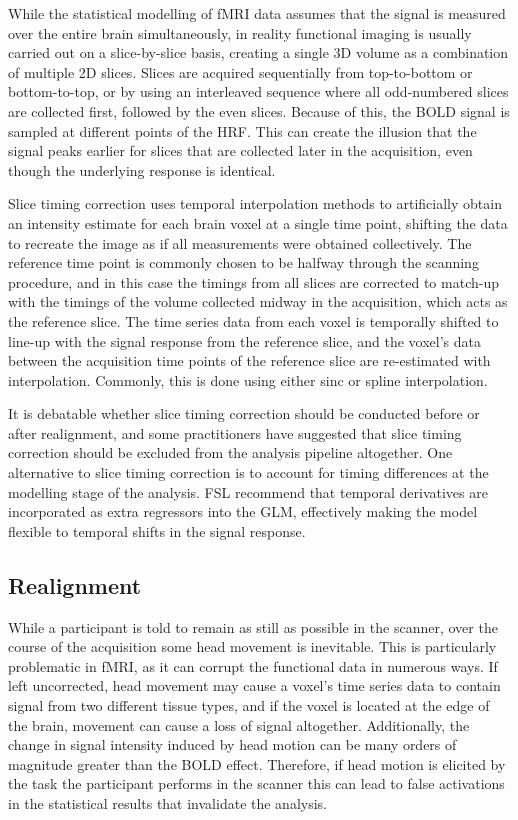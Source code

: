 While the statistical modelling of fMRI data assumes that the signal is measured over the entire brain simultaneously, in reality functional imaging is usually carried out on a slice-by-slice basis, creating a single 3D volume as a combination of multiple 2D slices. Slices are acquired sequentially from top-to-bottom or bottom-to-top, or by using an interleaved sequence where all odd-numbered slices are collected first, followed by the even slices. Because of this, the BOLD signal is sampled at different points of the HRF. This can create the illusion that the signal peaks earlier for slices that are collected later in the acquisition, even though the underlying response is identical. 

Slice timing correction uses temporal interpolation methods to artificially obtain an intensity estimate for each brain voxel at a single time point, shifting the data to recreate the image as if all measurements were obtained collectively. The reference time point is commonly chosen to be halfway through the scanning procedure, and in this case the timings from all slices are corrected to match-up with the timings of the volume collected midway in the acquisition, which acts as the reference slice. The time series data from each voxel is temporally shifted to line-up with the signal response from the reference slice, and the voxel's data between the acquisition time points of the reference slice are re-estimated with interpolation. Commonly, this is done using either sinc or spline interpolation. 

It is debatable whether slice timing correction should be conducted before or after realignment, and some practitioners have suggested that slice timing correction should be excluded from the analysis pipeline altogether. One alternative to slice timing correction is to account for timing differences at the modelling stage of the analysis. FSL recommend that temporal derivatives are incorporated as extra regressors into the GLM, effectively making the model flexible to temporal shifts in the signal response. 

\subsection{Realignment}

While a participant is told to remain as still as possible in the scanner, over the course of the acquisition some head movement is inevitable. This is particularly problematic in fMRI, as it can corrupt the functional data in numerous ways. If left uncorrected, head movement may cause a voxel's time series data to contain signal from two different tissue types, and if the voxel is located at the edge of the brain, movement can cause a loss of signal altogether. Additionally, the change in signal intensity induced by head motion can be many orders of magnitude greater than the BOLD effect. Therefore, if head motion is elicited by the task the participant performs in the scanner this can lead to false activations in the statistical results that invalidate the analysis. 


